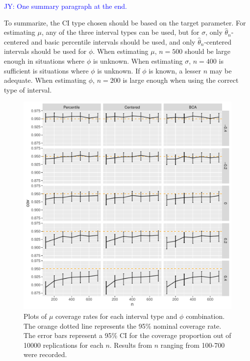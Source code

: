 \documentclass[12pt, letterpaper, titlepage]{article}
\newcommand{\jy}[1]{\textcolor{blue}{JY: #1}}
\begin{document}
\jy{One summary paragraph at the end.}

To summarize, the CI type chosen should be based on the target parameter.
For estimating $\mu$, any of the three interval types can be used, but for
$\sigma$, only $\hat{\theta}_{n}$-centered and basic percentile intervals
should be used, and only $\hat{\theta}_{n}$-centered intervals should be used
for $\phi$. When estimating
$\mu$, $n = 500$ should be large enough in situations where $\phi$ is unknown.
When estimating $\sigma$, $n = 400$ is sufficient is situations where $\phi$ is
unknown. If $\phi$ is known, a lesser $n$ may be adequate. When estimating
$\phi$, $n = 200$ is large enough when using the correct type of interval.

\begin{figure}[tbp]
  \centering
  \includegraphics[width=\textwidth]{figures/plot_mu}
  \caption{Plots of $\mu$ coverage rates for each interval type and $\phi$
    combination. The orange dotted line represents the 95\% nominal coverage
    rate. The error bars represent a 95\% CI for the coverage
    proportion out of 10000 replications for each $n$. Results from $n$
    ranging from 100-700 were recorded.}
  \label{fig:mu}
\end{figure}
\end{document}
